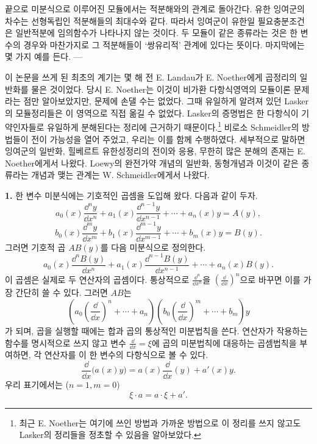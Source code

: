 끝으로 미분식으로 이루어진 모듈에서는 적분해와의 관계로 돌아간다. 유한 잉여군의 차수는 선형독립인 적분해들의 최대수와 같다. 따라서 잉여군이 유한일 필요충분조건은 일반적분에 임의함수가 나타나지 않는 것이다. 두 모듈이 같은 종류라는 것은 한 변수의 경우와 마찬가지로 그 적분해들이 ‘쌍유리적’ 관계에 있다는 뜻이다. 마지막에는 몇 가지 예를 든다. ---

이 논문을 쓰게 된 최초의 계기는 몇 해 전 E. Landau가 E. Noether에게 곱정리의 일반화를 물은 것이었다. 당시 E. Noether는 이것이 비가환 다항식영역의 모듈이론 문제라는 점만 알아보았지만, 문제에 손댈 수는 없었다. 그때 유일하게 알려져 있던 Lasker의 모듈정리들은 이 영역으로 직접 옮길 수 없었다. Lasker의 증명법은 한 다항식이 기약인자들로 유일하게 분해된다는 정리에 근거하기 때문이다.\footnote{최근 E. Noether는 여기에 쓰인 방법과 가까운 방법으로 이 정리를 쓰지 않고도 Lasker의 정리들을 정초할 수 있음을 알아보았다.} 비로소 Schmeidler의 방법들이 전이 가능성을 열어 주었고, 우리는 이를 함께 수행하였다. 세부적으로 말하면 잉여군의 일반화, 힐베르트 유한성정리의 전이와 응용, 무한히 많은 분해의 존재는 E. Noether에게서 나왔다. Loewy의 완전가약 개념의 일반화, 동형개념과 이것이 같은 종류라는 개념과 맺는 관계는 W. Schmeidler에게서 나왔다.


\textbf{1.} 한 변수 미분식에는 기호적인 곱셈을 도입해 왔다. 다음과 같이 두자.
\[
 a_0(x)\frac{\dd^n y}{\dd x^n}+a_1(x)\frac{\dd^{n-1}y}{\dd x^{n-1}}+\cdots+a_n(x)y=A(y),
\]
\[
 b_0(x)\frac{\dd^m y}{\dd x^m}+b_1(x)\frac{\dd^{m-1}y}{\dd x^{m-1}}+\cdots+b_m(x)y=B(y).
\]
그러면 기호적 곱 \(AB(y)\)를 다음 미분식으로 정의한다.
\[
 a_0(x)\frac{\dd^n B(y)}{\dd x^n}+a_1(x)\frac{\dd^{n-1}B(y)}{\dd x^{n-1}}+\cdots+a_n(x)B(y).
\]
이 곱셈은 실제로 두 연산자의 곱셈이다. 통상적으로 \(\frac{\dd^n}{\dd x^n}\)을 \(\left(\frac{\dd}{\dd x}\right)^n\)으로 바꾸면 이를 가장 간단히 쓸 수 있다. 그러면 \(AB\)는
\[
 \left(a_0\left(\frac{\dd}{\dd x}\right)^n+\cdots+a_n\right)
 \left(b_0\left(\frac{\dd}{\dd x}\right)^m+\cdots+b_m\right)y
\]
가 되며, 곱을 실행할 때에는 합과 곱의 통상적인 미분법칙을 쓴다. 연산자가 작용하는 함수를 명시적으로 쓰지 않고 변수 \(\frac{\dd}{\dd x}=\xi\)에 곱의 미분법칙에 대응하는 곱셈법칙을 부여하면, 각 연산자를 이 한 변수의 다항식으로 볼 수 있다.
\[
 \frac{\dd}{\dd x}\bigl(a(x)y\bigr)=a(x)\frac{\dd}{\dd x}(y)+a'(x)y.
\]
우리 표기에서는 (\(n=1,m=0\))
\begin{equation}
 \xi\cdot a=a\cdot\xi+a'.
\tag{1}
\end{equation}

